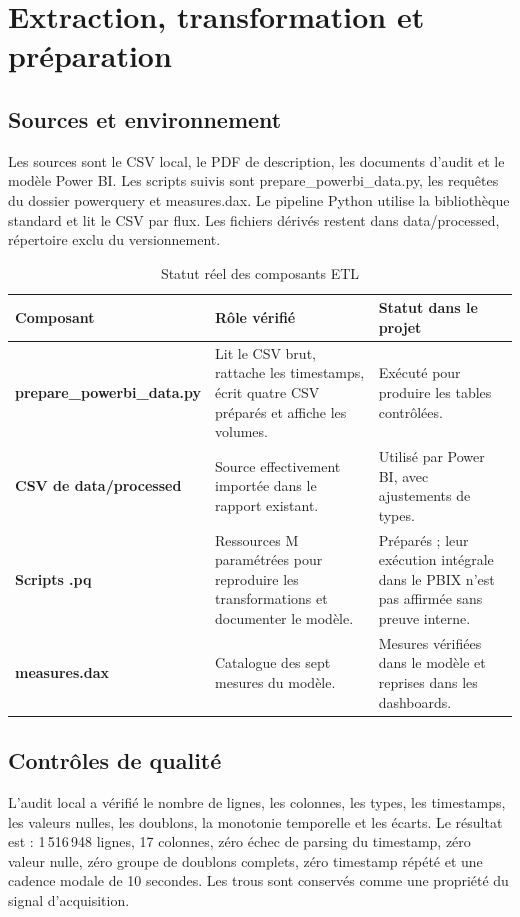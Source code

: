\chapter{Extraction, transformation et préparation}

\section{Sources et environnement}
Les sources sont le CSV local, le PDF de description, les documents d'audit et le modèle Power BI. Les scripts suivis sont prepare\_powerbi\_data.py, les requêtes du dossier powerquery et measures.dax. Le pipeline Python utilise la bibliothèque standard et lit le CSV par flux. Les fichiers dérivés restent dans data/processed, répertoire exclu du versionnement.

\begin{table}[H]
\centering
\caption{Statut réel des composants ETL}
\label{tab:etl-status}
\begin{tabularx}{\textwidth}{>{\bfseries}l X X}
\toprule
Composant & Rôle vérifié & Statut dans le projet\\
\midrule
prepare\_powerbi\_data.py & Lit le CSV brut, rattache les timestamps, écrit quatre CSV préparés et affiche les volumes. & Exécuté pour produire les tables contrôlées.\\
CSV de data/processed & Source effectivement importée dans le rapport existant. & Utilisé par Power BI, avec ajustements de types.\\
Scripts .pq & Ressources M paramétrées pour reproduire les transformations et documenter le modèle. & Préparés ; leur exécution intégrale dans le PBIX n'est pas affirmée sans preuve interne.\\
measures.dax & Catalogue des sept mesures du modèle. & Mesures vérifiées dans le modèle et reprises dans les dashboards.\\
\bottomrule
\end{tabularx}
\end{table}

\section{Contrôles de qualité}
L'audit local a vérifié le nombre de lignes, les colonnes, les types, les timestamps, les valeurs nulles, les doublons, la monotonie temporelle et les écarts. Le résultat est : 1\,516\,948 lignes, 17 colonnes, zéro échec de parsing du timestamp, zéro valeur nulle, zéro groupe de doublons complets, zéro timestamp répété et une cadence modale de 10 secondes. Les trous sont conservés comme une propriété du signal d'acquisition.

